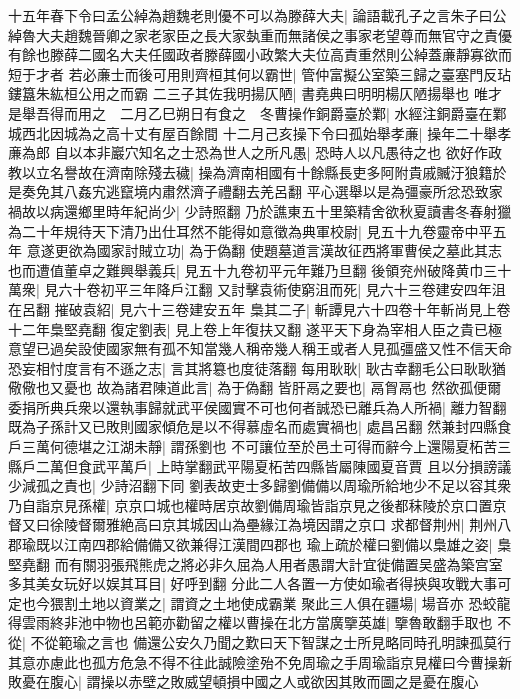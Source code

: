 十五年春下令曰孟公綽為趙魏老則優不可以為滕薛大夫|{
	論語載孔子之言朱子曰公綽魯大夫趙魏晉卿之家老家臣之長大家埶重而無諸侯之事家老望尊而無官守之責優有餘也滕薛二國名大夫任國政者滕薛國小政繁大夫位高責重然則公綽蓋亷靜寡欲而短于才者}
若必亷士而後可用則齊桓其何以霸世|{
	管仲富擬公室築三歸之臺塞門反玷鏤簋朱紘桓公用之而霸}
二三子其佐我明揚仄陋|{
	書堯典曰明明楊仄陋揚舉也}
唯才是舉吾得而用之　二月乙巳朔日有食之　冬曹操作銅爵臺於鄴|{
	水經注銅爵臺在鄴城西北因城為之高十丈有屋百餘間}
十二月己亥操下令曰孤始舉孝亷|{
	操年二十舉孝亷為郎}
自以本非巖穴知名之士恐為世人之所凡愚|{
	恐時人以凡愚待之也}
欲好作政教以立名譽故在濟南除殘去穢|{
	操為濟南相國有十餘縣長吏多阿附貴戚贓汙狼籍於是奏免其八姦宄逃竄境内肅然濟子禮翻去羌呂翻}
平心選舉以是為彊豪所忿恐致家禍故以病還鄉里時年紀尚少|{
	少詩照翻}
乃於譙東五十里築精舍欲秋夏讀書冬春射獵為二十年規待天下清乃出仕耳然不能得如意徵為典軍校尉|{
	見五十九卷靈帝中平五年}
意遂更欲為國家討賊立功|{
	為于偽翻}
使題墓道言漢故征西將軍曹侯之墓此其志也而遭值董卓之難興舉義兵|{
	見五十九卷初平元年難乃旦翻}
後領兖州破降黄巾三十萬衆|{
	見六十卷初平三年降戶江翻}
又討擊袁術使窮沮而死|{
	見六十三卷建安四年沮在呂翻}
摧破袁紹|{
	見六十三卷建安五年}
梟其二子|{
	斬譚見六十四卷十年斬尚見上卷十二年梟堅堯翻}
復定劉表|{
	見上卷上年復扶又翻}
遂平天下身為宰相人臣之貴已極意望已過矣設使國家無有孤不知當幾人稱帝幾人稱王或者人見孤彊盛又性不信天命恐妄相忖度言有不遜之志|{
	言其將簒也度徒落翻}
每用耿耿|{
	耿古幸翻毛公曰耿耿猶儆儆也又憂也}
故為諸君陳道此言|{
	為于偽翻}
皆肝鬲之要也|{
	鬲胷鬲也}
然欲孤便爾委捐所典兵衆以還執事歸就武平侯國實不可也何者誠恐已離兵為人所禍|{
	離力智翻}
既為子孫計又已敗則國家傾危是以不得慕虛名而處實禍也|{
	處昌呂翻}
然兼封四縣食戶三萬何德堪之江湖未靜|{
	謂孫劉也}
不可讓位至於邑土可得而辭今上還陽夏柘苦三縣戶二萬但食武平萬戶|{
	上時掌翻武平陽夏柘苦四縣皆屬陳國夏音賈}
且以分損謗議少減孤之責也|{
	少詩沼翻下同}
劉表故吏士多歸劉備備以周瑜所給地少不足以容其衆乃自詣京見孫權|{
	京京口城也權時居京故劉備周瑜皆詣京見之後都秣陵於京口置京督又曰徐陵督爾雅絶高曰京其城因山為壘緣江為境因謂之京口}
求都督荆州|{
	荆州八郡瑜既以江南四郡給備備又欲兼得江漢間四郡也}
瑜上疏於權曰劉備以梟雄之姿|{
	梟堅堯翻}
而有關羽張飛熊虎之將必非久屈為人用者愚謂大計宜徙備置吴盛為築宫室多其美女玩好以娱其耳目|{
	好呼到翻}
分此二人各置一方使如瑜者得挾與攻戰大事可定也今猥割土地以資業之|{
	謂資之土地使成霸業}
聚此三人俱在疆場|{
	場音亦}
恐蛟龍得雲雨終非池中物也呂範亦勸留之權以曹操在北方當廣擥英雄|{
	擥魯敢翻手取也}
不從|{
	不從範瑜之言也}
備還公安久乃聞之歎曰天下智謀之士所見略同時孔明諫孤莫行其意亦慮此也孤方危急不得不往此誠險塗殆不免周瑜之手周瑜詣京見權曰今曹操新敗憂在腹心|{
	謂操以赤壁之敗威望頓損中國之人或欲因其敗而圖之是憂在腹心}
